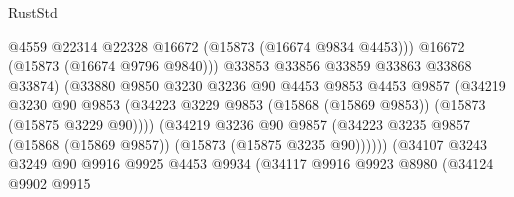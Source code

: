 \begin{lexlean}{RustStd}
\begin{coremodule}
                                          @4559
                                          @22314
                                          @22328
                                          @16672
                                          (@15873 (@16674 @9834 @4453)))
                                        @16672
                                        (@15873 (@16674 @9796 @9840)))
                                      @33853
                                      @33856
                                      @33859
                                      @33863
                                      @33868
                                      @33874)
                                    (@33880
                                      @9850
                                      @3230
                                      @3236
                                      @90
                                      @4453
                                      @9853
                                      @4453
                                      @9857
                                      (@34219
                                        @3230
                                        @90
                                        @9853
                                        (@34223
                                          @3229
                                          @9853
                                          (@15868 (@15869 @9853))
                                          (@15873 (@15875 @3229 @90))))
                                      (@34219
                                        @3236
                                        @90
                                        @9857
                                        (@34223
                                          @3235
                                          @9857
                                          (@15868 (@15869 @9857))
                                          (@15873 (@15875 @3235 @90))))))
                                  (@34107
                                    @3243
                                    @3249
                                    @90
                                    @9916
                                    @9925
                                    @4453
                                    @9934
                                    (@34117
                                      @9916
                                      @9923
                                      @8980
                                      (@34124
                                        @9902
                                        @9915

\end{coremodule}
\end{lexlean}
